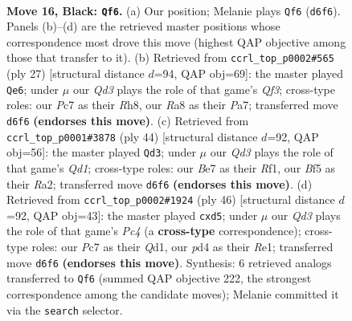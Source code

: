 \documentclass[11pt]{article}
\begin{document}
\clearpage

\begin{figure}[p]\centering
\begin{subfigure}{0.46\textwidth}\centering
\resizebox{\linewidth}{!}{%
\newchessgame
\chessboard[
  setfen={rnr3k1/ppp1bp1p/3q2p1/P2pNb2/3P1P1P/1P2P1P1/8/RNBQ1RK1 b - - 0 16},
  showmover=false,
  pgfstyle=straightmove, color=movearrow, markmove={d6-f6}
]}
\caption{}
\end{subfigure}\hfill
\begin{subfigure}{0.46\textwidth}\centering
\resizebox{\linewidth}{!}{%
\newchessgame
\chessboard[
  setfen={r3k2r/pb3pp1/1ppb1q1p/3pN3/3P1P2/P5P1/1P2P2P/2RQKB1R b Kkq - 0 14},
  showmover=false,
  pgfstyle=straightmove, color=movearrow, markmove={f6-e6}
]}
\caption{}
\end{subfigure}
\\[4pt]
\begin{subfigure}{0.46\textwidth}\centering
\resizebox{\linewidth}{!}{%
\newchessgame
\chessboard[
  setfen={2r1r1k1/1pq2pp1/p6p/P1pPp3/2Pn2Pb/1P2B2P/R4PB1/3Q1RK1 w - - 1 23},
  showmover=false,
  pgfstyle=straightmove, color=movearrow, markmove={d1-d3}
]}
\caption{}
\end{subfigure}\hfill
\begin{subfigure}{0.46\textwidth}\centering
\resizebox{\linewidth}{!}{%
\newchessgame
\chessboard[
  setfen={2rr2k1/p4p2/1p1q2pb/2pnp2p/2PnP3/1P1B3P/PB3PP1/1R1QR2K w - - 0 24},
  showmover=false,
  pgfstyle=straightmove, color=movearrow, markmove={c4-d5}
]}
\caption{}
\end{subfigure}
\caption{\textbf{Move 16, Black: \texttt{Qf6}.} (a) Our position; Melanie plays \texttt{Qf6} (\texttt{d6f6}). Panels (b)--(d) are the retrieved master positions whose correspondence most drove this move (highest QAP objective among those that transfer to it). (b) Retrieved from \texttt{ccrl\_top\_p0002\#565} (ply 27) [structural distance $d$=94, QAP obj=69]: the master played \texttt{Qe6}; under $\mu$ our \emph{Qd3} plays the role of that game's \emph{Qf3}; cross-type roles: our \emph{P}c7 as their \emph{R}h8, our \emph{R}a8 as their \emph{P}a7; transferred move \texttt{d6f6} \textbf{(endorses this move)}. (c) Retrieved from \texttt{ccrl\_top\_p0001\#3878} (ply 44) [structural distance $d$=92, QAP obj=56]: the master played \texttt{Qd3}; under $\mu$ our \emph{Qd3} plays the role of that game's \emph{Qd1}; cross-type roles: our \emph{B}e7 as their \emph{R}f1, our \emph{B}f5 as their \emph{R}a2; transferred move \texttt{d6f6} \textbf{(endorses this move)}. (d) Retrieved from \texttt{ccrl\_top\_p0002\#1924} (ply 46) [structural distance $d$=92, QAP obj=43]: the master played \texttt{cxd5}; under $\mu$ our \emph{Qd3} plays the role of that game's \emph{Pc4} (a \textbf{cross-type} correspondence); cross-type roles: our \emph{P}c7 as their \emph{Q}d1, our \emph{p}d4 as their \emph{R}e1; transferred move \texttt{d6f6} \textbf{(endorses this move)}. Synthesis: 6 retrieved analogs transferred to \texttt{Qf6} (summed QAP objective 222, the strongest correspondence among the candidate moves); Melanie committed it via the \texttt{search} selector.}
\label{fig:thought-m31}
\end{figure}
\end{document}
